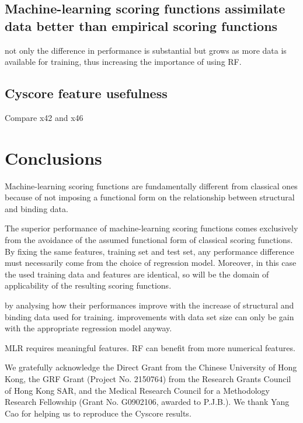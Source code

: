 \documentclass[journal=jacsat,manuscript=article]{achemso}
\begin{document}
\subsection{Machine-learning scoring functions assimilate data better than empirical scoring functions}

not only the difference in performance is substantial but grows as more data is available for training, thus increasing the importance of using RF.

\subsection{Cyscore feature usefulness}

Compare x42 and x46

\section{Conclusions}

Machine-learning scoring functions are fundamentally different from classical ones because of not imposing a functional form on the relationship between structural and binding data.

The superior performance of machine-learning scoring functions comes exclusively from the avoidance of the assumed functional form of classical scoring functions. By fixing the same features, training set and test set, any performance difference must necessarily come from the choice of regression model. Moreover, in this case the used training data and features are identical, so will be the domain of applicability of the resulting scoring functions. 

by analysing how their performances improve with the increase of structural and binding data used for training. improvements with data set size can only be gain with the appropriate regression model anyway.

MLR requires meaningful features. RF can benefit from more numerical features.

\begin{acknowledgement}

We gratefully acknowledge the Direct Grant from the Chinese University of Hong Kong, the GRF Grant (Project No. 2150764) from the Research Grants Council of Hong Kong SAR, and the Medical Research Council for a Methodology Research Fellowship (Grant No. G0902106, awarded to P.J.B.). We thank Yang Cao for helping us to reproduce the Cyscore results.

\end{acknowledgement}
\end{document}
